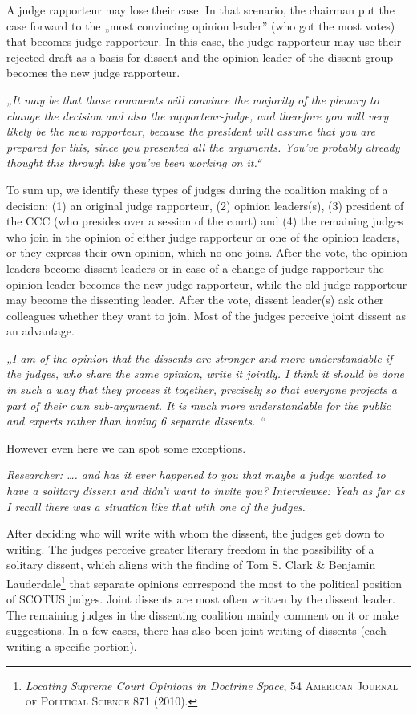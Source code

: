 \documentclass[
  11pt,
]{article}
\begin{document}
A judge rapporteur may lose their case. In that scenario, the chairman put the case forward to the „most convincing opinion leader'' (who got the most votes) that becomes judge rapporteur. In this case, the judge rapporteur may use their rejected draft as a basis for dissent and the opinion leader of the dissent group becomes the new judge rapporteur.

\emph{„It may be that those comments will convince the majority of the plenary to change the decision and also the rapporteur-judge, and therefore you will very likely be the new rapporteur, because the president will assume that you are prepared for this, since you presented all the arguments. You've probably already thought this through like you've been working on it.``}

To sum up, we identify these types of judges during the coalition making of a decision: (1) an original judge rapporteur, (2) opinion leaders(s), (3) president of the CCC (who presides over a session of the court) and (4) the remaining judges who join in the opinion of either judge rapporteur or one of the opinion leaders, or they express their own opinion, which no one joins. After the vote, the opinion leaders become dissent leaders or in case of a change of judge rapporteur the opinion leader becomes the new judge rapporteur, while the old judge rapporteur may become the dissenting leader. After the vote, dissent leader(s) ask other colleagues whether they want to join. Most of the judges perceive joint dissent as an advantage.

\emph{„I am of the opinion that the dissents are stronger and more understandable if the judges, who share the same opinion, write it jointly. I think it should be done in such a way that they process it together, precisely so that everyone projects a part of their own sub-argument. It is much more understandable for the public and experts rather than having 6 separate dissents. ``}

However even here we can spot some exceptions.

\emph{Researcher: \ldots. and has it ever happened to you that maybe a judge wanted to have a solitary dissent and didn't want to invite you?}
\emph{Interviewee: Yeah as far as I recall there was a situation like that with one of the judges.}

After deciding who will write with whom the dissent, the judges get down to writing. The judges perceive greater literary freedom in the possibility of a solitary dissent, which aligns with the finding of Tom S. Clark \& Benjamin Lauderdale\footnote{\emph{Locating {Supreme Court Opinions} in {Doctrine Space}}, 54 \textsc{American Journal of Political Science} 871 (2010).} that separate opinions correspond the most to the political position of SCOTUS judges. Joint dissents are most often written by the dissent leader. The remaining judges in the dissenting coalition mainly comment on it or make suggestions. In a few cases, there has also been joint writing of dissents (each writing a specific portion).
\end{document}
